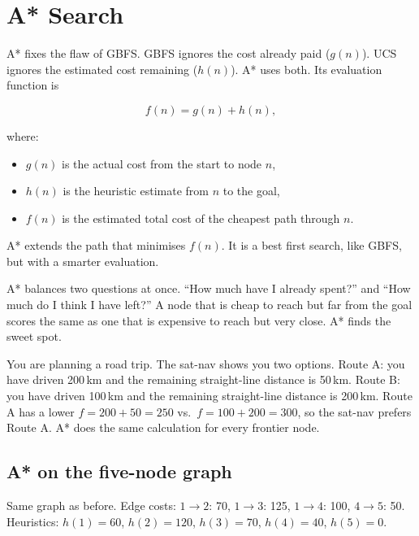 \documentclass[a4paper,11pt]{article}
\begin{document}
\section{A* Search}

A* fixes the flaw of GBFS. GBFS ignores the cost already paid ($g(n)$). UCS
ignores the estimated cost remaining ($h(n)$). A* uses both. Its evaluation
function is

\[
  f(n) = g(n) + h(n),
\]

where:
\begin{itemize}
  \item $g(n)$ is the actual cost from the start to node $n$,
  \item $h(n)$ is the heuristic estimate from $n$ to the goal,
  \item $f(n)$ is the estimated total cost of the cheapest path through $n$.
\end{itemize}

A* extends the path that minimises $f(n)$. It is a best first search, like
GBFS, but with a smarter evaluation.

\begin{intuition}
A* balances two questions at once. ``How much have I already spent?'' and
``How much do I think I have left?'' A node that is cheap to reach but far
from the goal scores the same as one that is expensive to reach but very
close. A* finds the sweet spot.
\end{intuition}

\begin{everyday}
You are planning a road trip. The sat-nav shows you two options. Route A:
you have driven 200\,km and the remaining straight-line distance is 50\,km.
Route B: you have driven 100\,km and the remaining straight-line distance is
200\,km. Route A has a lower $f = 200+50 = 250$ vs.\ $f = 100+200 = 300$,
so the sat-nav prefers Route A. A* does the same calculation for every
frontier node.
\end{everyday}

\subsection*{A* on the five-node graph}

Same graph as before. Edge costs: $1\to2$: 70, $1\to3$: 125, $1\to4$: 100,
$4\to5$: 50. Heuristics: $h(1)=60$, $h(2)=120$, $h(3)=70$, $h(4)=40$,
$h(5)=0$.
\end{document}
